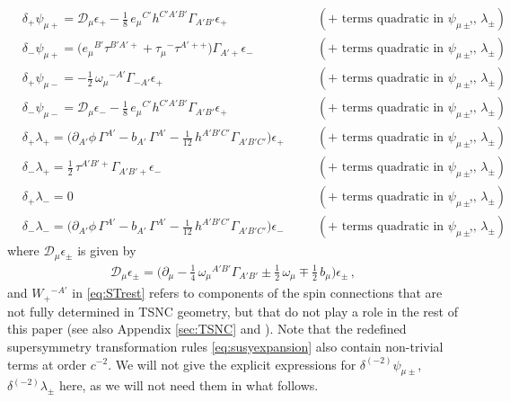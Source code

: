 \documentclass[a4paper,10pt,openany]{article}
\begin{document}
	\begin{subequations}
		\label{eq:NRsupersymmetry}
		\begin{align}
			&\delta_+\psi_{\mu+} =\mathcal D_\mu\epsilon_+ - \frac18\,e_\mu{}^{C'}h^{C'A'B'}\Gamma_{A'B'}\epsilon_+ && \quad(\text{+ terms quadratic in $\psi_{\mu\pm}$, $\lambda_{\pm}$})\,,\\
			&\delta_-\psi_{\mu+} = \big(e_\mu{}^{B'}\tau^{B'A'+} + \tau_\mu{}^-\tau^{A'++}\big)\Gamma_{A'+}\epsilon_- && \quad(\text{+ terms quadratic in $\psi_{\mu\pm}$, $\lambda_{\pm}$})\,,\\
			&\delta_+\psi_{\mu-} = -\frac12\,\omega_\mu{}^{-A'}\Gamma_{-A'}\epsilon_+ && \quad(\text{+ terms quadratic in $\psi_{\mu\pm}$, $\lambda_{\pm}$})\,,\\
			&\delta_-\psi_{\mu-} = \mathcal D_\mu\epsilon_- - \frac18\,e_\mu{}^{C'}h^{C'A'B'}\Gamma_{A'B'}\epsilon_+ && \quad(\text{+ terms quadratic in $\psi_{\mu\pm}$, $\lambda_{\pm}$})\,,\\
			&\delta_+\lambda_+ = \big(\mathcal \partial_{A'}\phi\,\Gamma^{A'} - b_{A'}\,\Gamma^{A'} - \frac{1}{12}\,h^{A'B'C'}\Gamma_{A'B'C'}\big)\epsilon_+&& \quad(\text{+ terms quadratic in $\psi_{\mu\pm}$, $\lambda_{\pm}$})\,,\\
			&\delta_-\lambda_+ = \frac12\,\tau^{A'B'+}\Gamma_{A'B'+}\epsilon_-&& \quad(\text{+ terms quadratic in $\psi_{\mu\pm}$, $\lambda_{\pm}$})\,,\\
			&\delta_+\lambda_- = 0&& \quad(\text{+ terms quadratic in $\psi_{\mu\pm}$, $\lambda_{\pm}$})\,,\\
			&\delta_-\lambda_- = \big(\mathcal \partial_{A'}\phi\,\Gamma^{A'} - b_{A'}\,\Gamma^{A'}- \frac{1}{12}\,h^{A'B'C'}\Gamma_{A'B'C'}\big)\epsilon_-&& \quad(\text{+ terms quadratic in $\psi_{\mu\pm}$, $\lambda_{\pm}$})\,,
		\end{align}
	\end{subequations}
	where $\mathcal D_\mu \epsilon_\pm$ is given by
	\begin{align}
		\mathcal D_\mu\epsilon_\pm = \bigg(\partial_\mu - \frac14\,\omega_\mu{}^{A'B'}\Gamma_{A'B'}\pm\frac12\,\omega_\mu\mp\frac12\,b_\mu\bigg)\epsilon_\pm\,,
	\end{align}
	and $W_+{}^{-A'}$ in \eqref{eq:STrest} refers to components of the spin connections that are not fully determined in TSNC geometry, but that do not play a role in the rest of this paper (see also Appendix \ref{sec:TSNC} and \cite{Bergshoeff:2021bmc}). Note that the redefined supersymmetry transformation rules \eqref{eq:susyexpansion} also contain non-trivial terms at order $c^{-2}$. We will not give the explicit expressions for $\delta^{(-2)} \psi_{\mu\pm}$, $\delta^{(-2)} \lambda_\pm$ here, as we will not need them in what follows.
	
\end{document}
